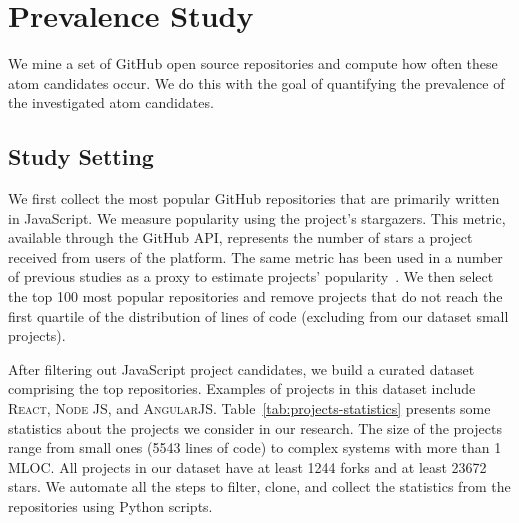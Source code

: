 \section{Prevalence Study}\label{sec:s04}


We mine a set of GitHub open source repositories and compute how often these atom candidates occur. We do this with the goal of quantifying the prevalence of the investigated atom candidates. 

\subsection{Study Setting}

We first collect the most popular GitHub repositories that are primarily written in JavaScript. We measure popularity using the project's stargazers. This metric, available through the GitHub API, represents the number of stars a project received from users of the platform. The same metric has been used in a number of previous studies as a proxy to estimate projects' popularity~\cite{gyimesi2019bugsjs,canedo:esem2020}. We then select the top 100 most popular repositories and remove projects that do not reach the first quartile of the distribution of lines of code (excluding from our dataset small projects). 

After filtering out JavaScript project candidates, we build a curated dataset comprising the top \minedprojects repositories. Examples of projects in this dataset include \textsc{React}, \textsc{Node JS}, and \textsc{AngularJS}. Table~\ref{tab:projects-statistics} presents some statistics about the projects we consider in our research. The size of the projects range from small ones (5543 lines of code) to complex systems with more than 1 MLOC. All projects in our dataset have at least \num[group-separator = {,}]{1244} forks and at least \num[group-separator = {,}]{23672} stars. We automate all the steps to filter, clone, and collect the statistics from the repositories using Python scripts.

